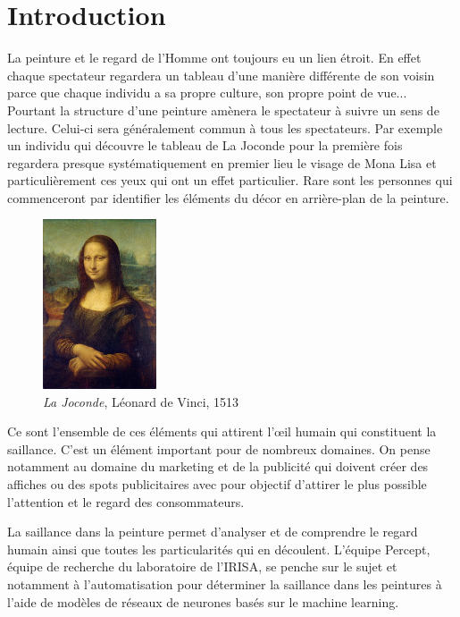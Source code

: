 \chapter{Introduction}


\par
La peinture et le regard de l'Homme ont toujours eu un lien étroit. En effet chaque spectateur regardera un tableau d'une manière différente de son voisin parce que chaque individu a sa propre culture, son propre point de vue... Pourtant la structure d'une peinture amènera le spectateur à suivre un sens de lecture. Celui-ci sera généralement commun à tous les spectateurs. Par exemple un individu qui découvre le tableau de La Joconde pour la première fois regardera presque systématiquement en premier lieu le visage de Mona Lisa et particulièrement ces yeux qui ont un effet particulier. Rare sont les personnes qui commenceront par identifier les éléments du décor en arrière-plan de la peinture.

\begin{figure}[h]
    \centering
    \includegraphics[width=0.3\textwidth]
                    {datas/Mona_Lisa_by_Leonardo_da_Vinci.jpg}
    \caption{\emph{La Joconde}, Léonard de Vinci, 1513}
\end{figure}

\par
Ce sont l'ensemble de ces éléments qui attirent l'\oe{}il humain qui constituent la saillance. C'est un élément important pour de nombreux domaines. On pense notamment au domaine du marketing et de la publicité qui doivent créer des affiches ou des spots publicitaires avec pour objectif d'attirer le plus possible l'attention et le regard des consommateurs.

\par
La saillance dans la peinture permet d'analyser et de comprendre le regard humain ainsi que toutes les particularités qui en découlent. L'équipe Percept, équipe de recherche du laboratoire de l'IRISA, se penche sur le sujet et notamment à l'automatisation pour déterminer la saillance dans les peintures à l'aide de modèles de réseaux de neurones basés sur le machine learning.

